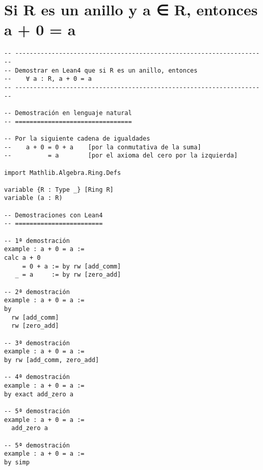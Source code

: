\section{Si R es un anillo y a ∈ R, entonces a + 0 = a}
\label{sec:orgc380161}
\begin{verbatim}
-- ---------------------------------------------------------------------
-- Demostrar en Lean4 que si R es un anillo, entonces
--    ∀ a : R, a + 0 = a
-- ---------------------------------------------------------------------

-- Demostración en lenguaje natural
-- ================================

-- Por la siguiente cadena de igualdades
--    a + 0 = 0 + a    [por la conmutativa de la suma]
--          = a        [por el axioma del cero por la izquierda]

import Mathlib.Algebra.Ring.Defs

variable {R : Type _} [Ring R]
variable (a : R)

-- Demostraciones con Lean4
-- ========================

-- 1ª demostración
example : a + 0 = a :=
calc a + 0
     = 0 + a := by rw [add_comm]
   _ = a     := by rw [zero_add]

-- 2ª demostración
example : a + 0 = a :=
by
  rw [add_comm]
  rw [zero_add]

-- 3ª demostración
example : a + 0 = a :=
by rw [add_comm, zero_add]

-- 4ª demostración
example : a + 0 = a :=
by exact add_zero a

-- 5ª demostración
example : a + 0 = a :=
  add_zero a

-- 5ª demostración
example : a + 0 = a :=
by simp
\end{verbatim}

